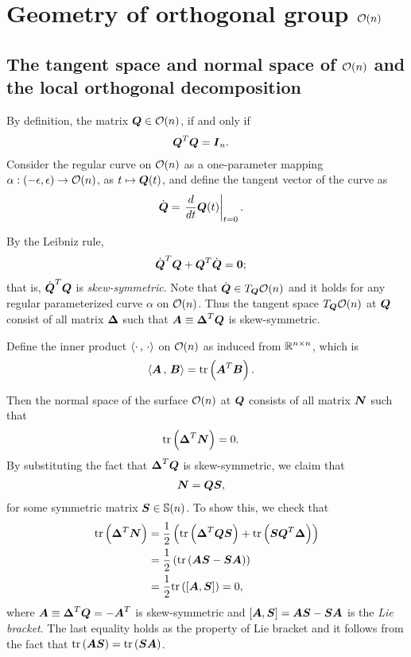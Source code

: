 \documentclass[11pt]{article}
\begin{document}
\newpage
\section{Geometry of orthogonal group ${\mathcal O}(n)$}
\subsection{The tangent space and normal space of ${\mathcal O}(n)$ and the local orthogonal decomposition}
By definition, the matrix $\boldsymbol{Q} \in {\mathcal O}(n)$, if and only if 
\begin{align*}
\boldsymbol{Q}^{T}\boldsymbol{Q} &= \boldsymbol{I}_{n}.
\end{align*}
Consider the regular curve on ${\mathcal O}(n)$ as a one-parameter mapping $\alpha: (-\epsilon, \epsilon) \rightarrow {\mathcal O}(n)$, as $t \mapsto \boldsymbol{Q}(t)$, and define the tangent vector of the curve as 
\begin{align*}
\dot{\boldsymbol{Q}} &= \left.{\frac{d}{dt}\boldsymbol{Q}(t)}\right\vert_{t=0}.
\end{align*}

By the Leibniz rule, 
\begin{align}
\dot{\boldsymbol{Q}}^{T}\boldsymbol{Q} + \boldsymbol{Q}^{T}\dot{\boldsymbol{Q}} &= \boldsymbol{0}; \label{eqn: tangent_cond}
\end{align} that is, $\dot{\boldsymbol{Q}}^{T}\boldsymbol{Q}$ is \emph{skew-symmetric}. Note that $\dot{\boldsymbol{Q}} \in T_{\boldsymbol{Q}}{\mathcal O}(n)$ and it holds for any regular parameterized curve $\alpha$ on ${\mathcal O}(n)$. Thus the tangent space $T_{\boldsymbol{Q}}{\mathcal O}(n)$ at $\boldsymbol{Q}$ consist of  all matrix $\boldsymbol{\Delta}$ such that $\boldsymbol{A}\equiv \boldsymbol{\Delta}^{T}\boldsymbol{Q}$ is skew-symmetric. 


Define the inner product $\left\langle \cdot\,,\, \cdot \right\rangle$ on ${\mathcal O}(n)$ as induced from ${\mathbb R}^{n\times n}$, which is 
\begin{align*}
\left\langle \boldsymbol{A}\,,\, \boldsymbol{B} \right\rangle &= \text{tr}\left(\boldsymbol{A}^{T}\boldsymbol{B}\right).
\end{align*}

Then the normal space of the surface ${\mathcal O}(n)$ at $\boldsymbol{Q}$ consists of all matrix $\boldsymbol{N}$ such that 
\begin{align*}
\text{tr}\left(\boldsymbol{\Delta}^{T}\boldsymbol{N}\right) &= 0.
\end{align*} 
By substituting the fact that $\boldsymbol{\Delta}^{T}\boldsymbol{Q}$ is skew-symmetric, we claim that 
\begin{align}
\boldsymbol{N} &= \boldsymbol{Q}\boldsymbol{S}, \label{eqn: normal_form}
\end{align} for some symmetric matrix $\boldsymbol{S} \in {\mathbb S}(n)$. To show this, we check that 
\begin{align*}
\text{tr}\left(\boldsymbol{\Delta}^{T}\boldsymbol{N}\right) &=\frac{1}{2}\left( \text{tr}\left(\boldsymbol{\Delta}^{T}\boldsymbol{Q}\boldsymbol{S}\right) + \text{tr}\left(\boldsymbol{S}\boldsymbol{Q}^{T}\boldsymbol{\Delta}\right)\right) \\
&= \frac{1}{2}\left(\text{tr}\left(\boldsymbol{A}\boldsymbol{S} - \boldsymbol{S}\boldsymbol{A}\right)\right)\\
&= \frac{1}{2}\text{tr}\left(\left[\boldsymbol{A}, \boldsymbol{S}\right]\right) = 0,
\end{align*}
where $\boldsymbol{A}\equiv \boldsymbol{\Delta}^{T}\boldsymbol{Q} = -\boldsymbol{A}^{T}$ is skew-symmetric and $\left[\boldsymbol{A}, \boldsymbol{S}\right] = \boldsymbol{A}\boldsymbol{S} - \boldsymbol{S}\boldsymbol{A}$ is the \emph{Lie bracket}. The last equality holds as the property of Lie bracket and it follows from the fact that $\text{tr}\left(\boldsymbol{A}\boldsymbol{S}\right) = \text{tr}\left(\boldsymbol{S}\boldsymbol{A}\right)$.
\end{document}

